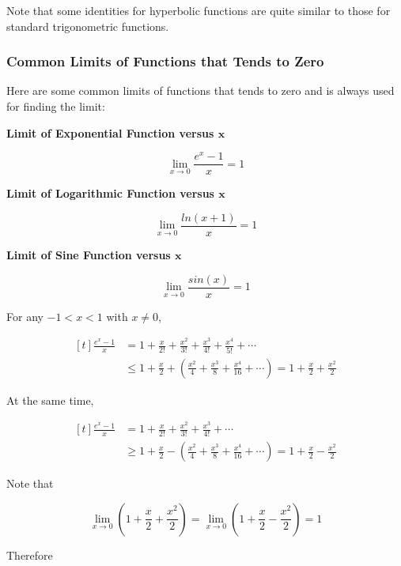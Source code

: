 \documentclass[a4paper,12pt]{article}
\begin{document}
Note that some identities for hyperbolic functions are quite similar to those for standard trigonometric functions.

\subsubsection{Common Limits of Functions that Tends to Zero}
\begin{thm}
  Here are some common limits of functions that tends to zero and is always used for finding the limit:

  \begin{alist}
    \item \textbf{Limit of Exponential Function versus $\boldsymbol{x}$}

    $$\lim_{x\to 0}\frac{e^{x}-1}{x}=1$$

    \item \textbf{Limit of Logarithmic Function versus $\boldsymbol{x}$}

    $$\lim_{x\to 0}\frac{ln(x+1)}{x}=1$$

    \item \textbf{Limit of Sine Function versus $\boldsymbol{x}$}

    $$\lim_{x\to 0}\frac{sin(x)}{x}=1$$

  \end{alist}

   For any $-1<x<1$ with $x\neq 0$,

  $$\begin{aligned}[t]
    \frac{e^{x}-1}{x}&=1+\frac{x}{2!}+\frac{x^{2}}{3!}+\frac{x^{3}}{4!}+\frac{x^{4}}{5!}+\cdots\\
    &\leq 1+\frac{x}{2}+(\frac{x^{2}}{4}+\frac{x^{3}}{8}+\frac{x^{4}}{16}+\cdots)=1+\frac{x}{2}+\frac{x^{2}}{2}
  \end{aligned}$$\s

  At the same time,

  $$\begin{aligned}[t]
    \frac{e^{x}-1}{x}&=1+\frac{x}{2!}+\frac{x^{2}}{3!}+\frac{x^{3}}{4!}+\cdots\\
    &\geq 1+\frac{x}{2}-(\frac{x^{2}}{4}+\frac{x^{3}}{8}+\frac{x^{4}}{16}+\cdots)=1+\frac{x}{2}-\frac{x^{2}}{2}
  \end{aligned}$$\s

  Note that

  $$\lim_{x\to 0}(1+\frac{x}{2}+\frac{x^{2}}{2})=\lim_{x\to 0}(1+\frac{x}{2}-\frac{x^{2}}{2})=1$$\s

  Therefore


\end{thm}
\end{document}
